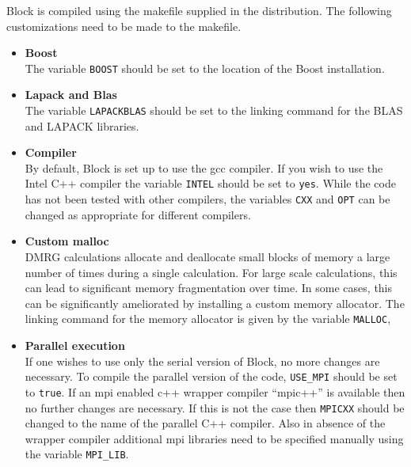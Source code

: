 \documentclass[letterpaper,12pt,aps, pra]{revtex4-1}
\begin{document}
Block is compiled using the makefile supplied in the distribution. The following customizations need to be made to the makefile.
\begin{itemize}
 \item \textbf{Boost}\\The variable \texttt{BOOST} should be set to the location of the Boost installation. 
\item \textbf{Lapack and Blas}\\ The variable \texttt{LAPACKBLAS} should be
set to the linking command for the BLAS and LAPACK libraries.
\item \textbf{Compiler}\\
By default, Block is set up to use the gcc compiler. If you wish to use the Intel C++ compiler the variable \texttt{INTEL} should be set to \texttt{yes}. 
While the code has not been tested with other compilers, the variables \texttt{CXX} 
and \texttt{OPT} can be changed as appropriate for different compilers.
\item \textbf{Custom malloc}\\
DMRG calculations allocate and deallocate small blocks of memory a large number of times during a single calculation. For large scale calculations,
this can lead to significant memory fragmentation over time. In some cases, this can be significantly ameliorated by installing a
custom memory allocator. The linking command for the memory allocator is given by the variable \texttt{MALLOC},
\item \textbf{Parallel execution}\\
If one wishes to use only the serial version of Block, no more changes are necessary. To compile the
parallel version of the code, \texttt{USE\_MPI} should be set to \texttt{true}.  If an mpi enabled c++ wrapper compiler ``mpic++'' is available then no further changes are necessary. If this is not the case then \texttt{MPICXX} should be changed to the name of the parallel C++ compiler.  Also in absence of the wrapper compiler additional mpi libraries need to be specified manually using the variable \texttt{MPI\_LIB}. %
\end{itemize}
\end{document}
